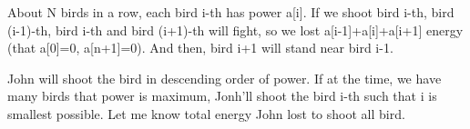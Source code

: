 About N birds in a row, each bird i-th has power a[i]. If we shoot bird i-th, bird (i-1)-th, bird i-th and bird (i+1)-th will fight, so we lost a[i-1]+a[i]+a[i+1] energy (that a[0]=0, a[n+1]=0). And then, bird i+1 will stand near bird i-1.

John will shoot the bird in descending order of power. If at the time, we have many birds that power is maximum, Jonh'll shoot the bird i-th such that i is smallest possible. Let me know total energy John lost to shoot all bird.